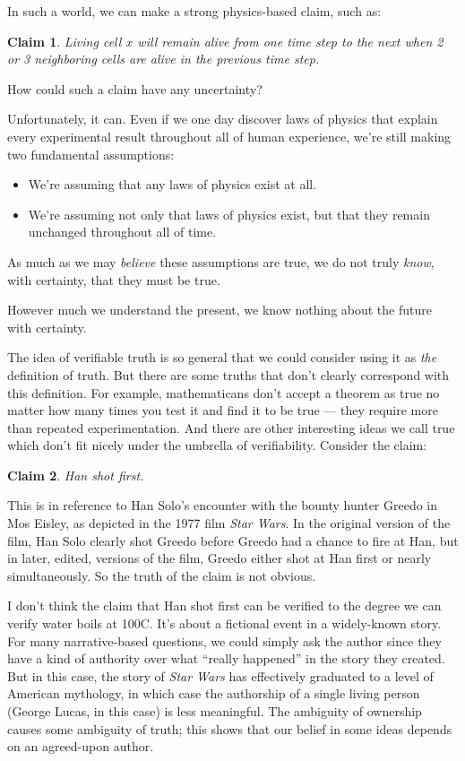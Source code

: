 \documentclass[11pt, oneside]{article}
\newtheorem*{claim}{Claim}
\theoremstyle{argtstyle}
\begin{document}
In such a world, we can make a strong physics-based claim, such as:
\begin{claim}
    Living cell $x$ will remain alive from one time step to the next when 2 or 3
    neighboring cells are alive in the previous time step.
\end{claim}

How could such a claim have any uncertainty?

Unfortunately, it can. Even if we one day discover laws of physics that
explain every experimental result throughout all of human
experience, we're still making two fundamental assumptions:
\begin{itemize}
    \item We're assuming that any laws of physics exist at all.
    \item We're assuming not only that laws of physics exist, but that they
        remain unchanged throughout all of time.
\end{itemize}
As much as we may {\em believe} these assumptions are true, we do not truly {\em
know}, with certainty, that they must be true.

However much we understand the present, we know nothing about
the future with certainty.

The idea of verifiable truth is so general that we could consider using it as
{\em the} definition of truth.
But there are some truths that don't clearly correspond with this definition.
For example, mathematicans don't accept a theorem as true no
matter how many times you test it and find it to be true --- they require
more than repeated experimentation.
And there are other interesting ideas we call true
which don't fit nicely under the umbrella of verifiability.
Consider the claim:
\begin{claim}\label{c2}
    Han shot first.
\end{claim}
This is in reference to Han Solo's encounter with the bounty hunter Greedo in
Mos Eisley, as depicted in the 1977 film {\em Star Wars}.
In the original version of the film, Han Solo clearly shot Greedo before Greedo
had a chance to
fire at Han, but in later, edited, versions of the film, Greedo either shot at
Han first or nearly simultaneously. So the truth of the claim is not
obvious.

I don't think the claim that Han shot first
can be verified to the degree we can verify
water boils at 100\degree C.
It's about a fictional event in a widely-known story.
For many narrative-based questions, we could simply ask the author since they
have a kind of authority over what ``really happened'' in the story they
created. But in this case, the story of {\em Star Wars} has effectively
graduated to a level of American mythology, in which case the authorship of a
single living person (George Lucas, in this case) is less meaningful.
The ambiguity of ownership causes some ambiguity of truth;
this shows that our belief in some ideas depends on an agreed-upon author.
\end{document}
